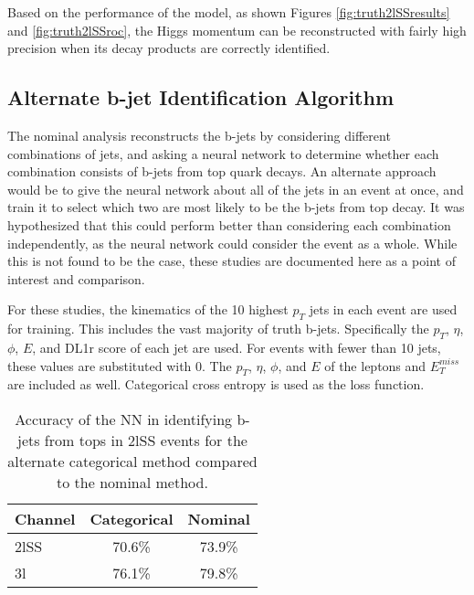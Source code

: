 Based on the performance of the model, as shown Figures \ref{fig:truth2lSSresults} and \ref{fig:truth2lSSroc}, the Higgs momentum can be reconstructed with fairly high precision when its decay products are correctly identified.

\subsection{Alternate b-jet Identification Algorithm}
\label{subsec:topRecoApx}

The nominal analysis reconstructs the b-jets by considering different combinations of jets, and asking a neural network to determine whether each combination consists of b-jets from top quark decays. An alternate approach would be to give the neural network about all of the jets in an event at once, and train it to select which two are most likely to be the b-jets from top decay. It was hypothesized that this could perform better than considering each combination independently, as the neural network could consider the event as a whole. While this is not found to be the case, these studies are documented here as a point of interest and comparison.

For these studies, the kinematics of the 10 highest $p_T$ jets in each event are used for training. This includes the vast majority of truth b-jets. Specifically the $p_T$, $\eta$, $\phi$, $E$, and DL1r score of each jet are used. For events with fewer than 10 jets, these values are substituted with 0. The $p_T$, $\eta$, $\phi$, and $E$ of the leptons and $E_T^{miss}$ are included as well. Categorical cross entropy is used as the loss function.

\begin{table}[H]
  \centering
  \caption{Accuracy of the NN in identifying b-jets from tops in 2lSS events for the alternate categorical method compared to the nominal method.}
  \begin{tabular}{l|c|c}                                                                                                     
  \hline\hline
  Channel & Categorical & Nominal \\                                                                              
  \hline                                                                                                                  
  2lSS & 70.6\% & 73.9\% \\
  3l & 76.1\% & 79.8\% \\
  \hline                                                                                                                 
  \end{tabular}                                                                                                           
  \label{tab:topMatchCatApx}
\end{table}


